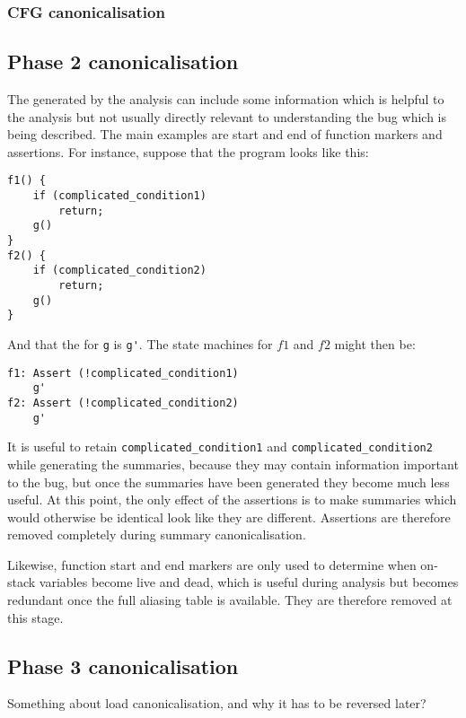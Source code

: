 \documentclass[12pt,a4paper]{book}
\begin{document}
\subsubsection{CFG canonicalisation}

\subsection{Phase 2 canonicalisation}
The \StateMachines generated by the analysis can include some information which is helpful to the analysis but not usually directly relevant to understanding the bug which is being described.
The main examples are start and end of function markers and assertions.
For instance, suppose that the program looks like this:

\begin{verbatim}
f1() {
    if (complicated_condition1)
        return;
    g()
}
f2() {
    if (complicated_condition2)
        return;
    g()
}
\end{verbatim}

And that the \StateMachine for \verb|g| is \verb|g'|.
The state machines for $f1$ and $f2$ might then be:

\begin{verbatim}
f1: Assert (!complicated_condition1)
    g'
f2: Assert (!complicated_condition2)
    g'
\end{verbatim}

It is useful to retain \verb|complicated_condition1| and \verb|complicated_condition2| while generating the summaries, because they may contain information important to the bug, but once the summaries have been generated they become much less useful.
At this point, the only effect of the assertions is to make summaries which would otherwise be identical look like they are different.
Assertions are therefore removed completely during summary canonicalisation.

Likewise, function start and end markers are only used to determine when on-stack variables become live and dead, which is useful during analysis but becomes redundant once the full aliasing table is available.
They are therefore removed at this stage.

\subsection{Phase 3 canonicalisation}

Something about load canonicalisation, and why it has to be reversed later?
\end{document}
